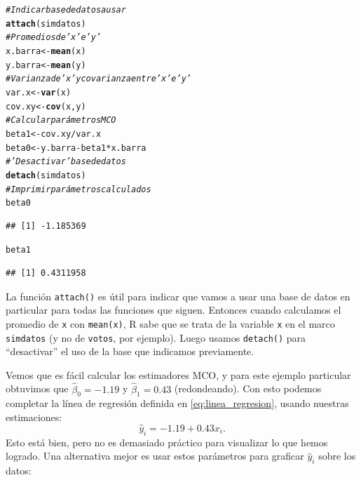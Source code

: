 \documentclass[12pt]{report}\usepackage[]{graphicx}\usepackage[]{color}
\makeatletter
\newcommand{\hlcom}[1]{\textcolor[rgb]{0.678,0.584,0.686}{\textit{#1}}}%
\newcommand{\hlopt}[1]{\textcolor[rgb]{0,0,0}{#1}}%
\newcommand{\hlstd}[1]{\textcolor[rgb]{0.345,0.345,0.345}{#1}}%
\newcommand{\hlkwb}[1]{\textcolor[rgb]{0.69,0.353,0.396}{#1}}%
\newcommand{\hlkwd}[1]{\textcolor[rgb]{0.737,0.353,0.396}{\textbf{#1}}}%
\newenvironment{kframe}{%
 \def\at@end@of@kframe{}%
 \ifinner\ifhmode%
  \def\at@end@of@kframe{\end{minipage}}%
  \begin{minipage}{\columnwidth}%
 \fi\fi%
 \def\FrameCommand##1{\hskip\@totalleftmargin \hskip-\fboxsep
 \colorbox{shadecolor}{##1}\hskip-\fboxsep
     \hskip-\linewidth \hskip-\@totalleftmargin \hskip\columnwidth}%
 \MakeFramed {\advance\hsize-\width
   \@totalleftmargin\z@ \linewidth\hsize
   \@setminipage}}%
 {\par\unskip\endMakeFramed%
 \at@end@of@kframe}
\newenvironment{knitrout}{}{} %
\makeatother
\begin{document}
\begin{knitrout}
\color{fgcolor}\begin{kframe}
\begin{alltt}
\hlcom{# Indicar base de datos a usar}
\hlkwd{attach}\hlstd{(simdatos)}
\hlcom{# Promedios de 'x' e 'y'}
\hlstd{x.barra} \hlkwb{<-} \hlkwd{mean}\hlstd{(x)}
\hlstd{y.barra} \hlkwb{<-} \hlkwd{mean}\hlstd{(y)}
\hlcom{# Varianza de 'x' y covarianza entre 'x' e 'y'}
\hlstd{var.x} \hlkwb{<-} \hlkwd{var}\hlstd{(x)}
\hlstd{cov.xy} \hlkwb{<-} \hlkwd{cov}\hlstd{(x,y)}
\hlcom{# Calcular parámetros MCO}
\hlstd{beta1} \hlkwb{<-} \hlstd{cov.xy}\hlopt{/}\hlstd{var.x}
\hlstd{beta0} \hlkwb{<-} \hlstd{y.barra} \hlopt{-} \hlstd{beta1}\hlopt{*}\hlstd{x.barra}
\hlcom{# 'Desactivar' base de datos}
\hlkwd{detach}\hlstd{(simdatos)}
\hlcom{# Imprimir parámetros calculados}
\hlstd{beta0}
\end{alltt}
\begin{verbatim}
## [1] -1.185369
\end{verbatim}
\begin{alltt}
\hlstd{beta1}
\end{alltt}
\begin{verbatim}
## [1] 0.4311958
\end{verbatim}
\end{kframe}
\end{knitrout}

\begin{Rbox}
La función \verb|attach()| es útil para indicar que vamos a usar una base de datos en particular para todas las funciones que siguen. Entonces cuando calculamos el promedio de \verb|x| con \verb|mean(x)|, R sabe que se trata de la variable \verb|x| en el marco \verb|simdatos| (y no de \verb|votos|, por ejemplo). Luego usamos \verb|detach()| para ``desactivar'' el uso de la base que indicamos previamente.
\end{Rbox}

Vemos que es fácil calcular los estimadores MCO, y para este ejemplo particular obtuvimos que $\hat \beta_0 = -1.19$ y $\hat \beta_1 = 0.43$ (redondeando).
Con esto podemos completar la línea de regresión definida en \eqref{eq:linea_regresion}, usando nuestras estimaciones:
\begin{equation*}
\hat y_i = -1.19 + 0.43x_i.
\end{equation*}
Esto está bien, pero no es demasiado práctico para visualizar lo que hemos logrado.
Una alternativa mejor es usar estos parámetros para graficar $\hat y_i$ sobre los datos:
\end{document}
